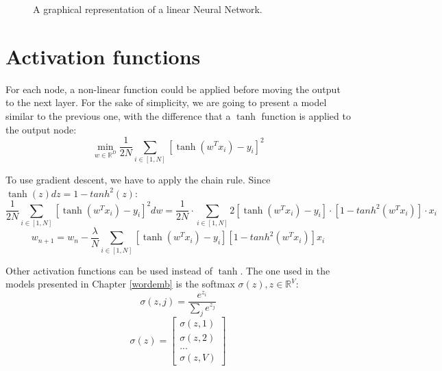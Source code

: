 \begin{figure}[h]
    \centering
    \caption{A graphical representation of a linear Neural Network.}
    \label{fig:nn-linear}
\end{figure}

\section{Activation functions}
For each node, a non-linear function could be applied before moving the output to the next layer.
For the sake of simplicity, we are going to present a model similar to the previous one,
with the difference that a $\tanh$ function is applied to the output node:
$$ \displaystyle \min_{w \in \mathbb{R}^D} \frac{1}{2N} \sum_{i \in [1, N]} [\tanh(w^T x_i) - y_i]^2 $$

To use gradient descent, we have to apply the chain rule.
Since $\tanh(z) dz = 1 - tanh^2(z)$:
$$ \frac{1}{2N} \sum_{i \in [1, N]} [\tanh(w^T x_i) - y_i]^2 dw =
    \frac{1}{2N} \cdot \sum_{i \in [1, N]} 2[\tanh(w^T x_i) - y_i] \cdot [1 - tanh^2(w^T x_i)] \cdot x_i $$
$$ w_{n+1} = w_n -
    \frac{\lambda}{N} \sum_{i \in [1, N]} [\tanh(w^T x_i) - y_i] [1 - tanh^2(w^T x_i)] x_i $$

Other activation functions can be used instead of $\tanh$.
The one used in the models presented in Chapter \ref{wordemb} is the softmax
$\sigma(z), z \in \mathbb{R}^V$:
$$\sigma(z, j) =  \frac{e^{z_i}}{\sum_j e^{z_j}}$$
$$ \sigma(z) =
    \begin{bmatrix}
        \sigma(z, 1) \\ \sigma(z, 2) \\ ... \\ \sigma(z, V)
    \end{bmatrix}
$$

